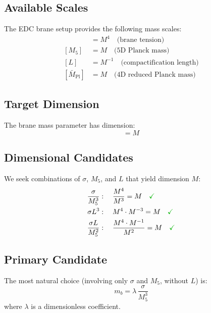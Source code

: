 \documentclass[11pt,a4paper]{article}
\newcommand{\Mpl}{\bar{M}_{\mathrm{Pl}}}
\newcommand{\Mfive}{M_5}
\newcommand{\mb}{m_b}
\newcommand{\emark}{\textcolor{green!70!black}{\checkmark}}
\theoremstyle{definition}
\theoremstyle{plain}
\theoremstyle{remark}
\begin{document}
\subsection{Available Scales}

The EDC brane setup provides the following mass scales:
\begin{align}
[\sigma] &= M^4 \quad \text{(brane tension)} \label{eq:dim-sigma} \\
[\Mfive] &= M \quad \text{(5D Planck mass)} \label{eq:dim-M5} \\
[L] &= M^{-1} \quad \text{(compactification length)} \label{eq:dim-L} \\
[\Mpl] &= M \quad \text{(4D reduced Planck mass)} \label{eq:dim-Mpl}
\end{align}

\subsection{Target Dimension}

The brane mass parameter has dimension:
\begin{equation}
[\mb] = M
\label{eq:dim-mb}
\end{equation}

\subsection{Dimensional Candidates}

We seek combinations of $\sigma$, $\Mfive$, and $L$ that yield dimension $M$:
\begin{align}
\frac{\sigma}{\Mfive^3} &: \quad \frac{M^4}{M^3} = M \quad \emark \label{eq:cand-1} \\
\sigma L^3 &: \quad M^4 \cdot M^{-3} = M \quad \emark \label{eq:cand-2} \\
\frac{\sigma L}{\Mfive^2} &: \quad \frac{M^4 \cdot M^{-1}}{M^2} = M \quad \emark \label{eq:cand-3}
\end{align}

\subsection{Primary Candidate}

The most natural choice (involving only $\sigma$ and $\Mfive$, without $L$) is:
\begin{equation}
\boxed{\mb = \lambda \, \frac{\sigma}{\Mfive^3}}
\label{eq:mb-primary}
\end{equation}
where $\lambda$ is a dimensionless coefficient.
\end{document}
